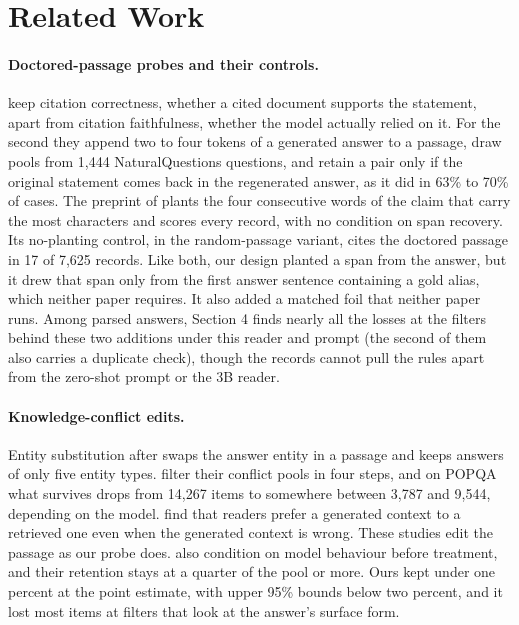 \documentclass[11pt]{article}
\begin{document}
\section{Related Work}\label{related-work}

\paragraph{Doctored-passage probes and their controls.} \citet{wallat2025correctness} keep citation correctness, whether a cited document supports the statement, apart from citation faithfulness, whether the model actually relied on it. For the second they append two to four tokens of a generated answer to a passage, draw pools from 1,444 NaturalQuestions questions, and retain a pair only if the original statement comes back in the regenerated answer, as it did in 63\% to 70\% of cases. The preprint of \citet{khan2026attributable} plants the four consecutive words of the claim that carry the most characters and scores every record, with no condition on span recovery. Its no-planting control, in the random-passage variant, cites the doctored passage in 17 of 7,625 records. Like both, our design planted a span from the answer, but it drew that span only from the first answer sentence containing a gold alias, which neither paper requires. It also added a matched foil that neither paper runs. Among parsed answers, Section 4 finds nearly all the losses at the filters behind these two additions under this reader and prompt (the second of them also carries a duplicate check), though the records cannot pull the rules apart from the zero-shot prompt or the 3B reader.

\paragraph{Knowledge-conflict edits.} Entity substitution after \citet{longpre2021entity} swaps the answer entity in a passage and keeps answers of only five entity types. \citet{xie2024adaptive} filter their conflict pools in four steps, and on POPQA what survives drops from 14,267 items to somewhere between 3,787 and 9,544, depending on the model. \citet{tan2024blinded} find that readers prefer a generated context to a retrieved one even when the generated context is wrong. These studies edit the passage as our probe does. \citet{xie2024adaptive} also condition on model behaviour before treatment, and their retention stays at a quarter of the pool or more. Ours kept under one percent at the point estimate, with upper 95\% bounds below two percent, and it lost most items at filters that look at the answer's surface form.
\end{document}
